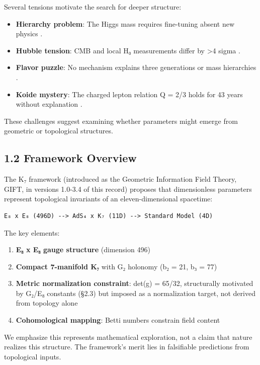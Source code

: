 \documentclass[11pt,a4paper]{article}
\begin{document}
Several tensions motivate the search for deeper structure:

\begin{itemize}
\tightlist
\item
  \textbf{Hierarchy problem}: The Higgs mass requires fine-tuning absent new physics \cite{2}.
\item
  \textbf{Hubble tension}: CMB and local H₀ measurements differ by \textgreater4 sigma \cite{3,4}.
\item
  \textbf{Flavor puzzle}: No mechanism explains three generations or mass hierarchies \cite{5}.
\item
  \textbf{Koide mystery}: The charged lepton relation Q = 2/3 holds for 43 years without explanation \cite{6}.
\end{itemize}

These challenges suggest examining whether parameters might emerge from geometric or topological structures.

\subsection{1.2 Framework Overview}\label{framework-overview}

The K₇ framework (introduced as the Geometric Information Field Theory, GIFT, in versions 1.0-3.4 of this record) proposes that dimensionless parameters represent topological invariants of an eleven-dimensional spacetime:

\begin{verbatim}
E₈ x E₈ (496D) --> AdS₄ x K₇ (11D) --> Standard Model (4D)
\end{verbatim}

The key elements:

\begin{enumerate}
\def\labelenumi{\arabic{enumi}.}
\tightlist
\item
  \textbf{E₈ x E₈ gauge structure} (dimension 496)
\item
  \textbf{Compact 7-manifold K₇} with G₂ holonomy (b₂ = 21, b₃ = 77)
\item
  \textbf{Metric normalization constraint}: det(g) = 65/32, structurally motivated by G₂/E₈ constants (§2.3) but imposed as a normalization target, not derived from topology alone
\item
  \textbf{Cohomological mapping}: Betti numbers constrain field content
\end{enumerate}

We emphasize this represents mathematical exploration, not a claim that nature realizes this structure. The framework's merit lies in falsifiable predictions from topological inputs.
\end{document}

